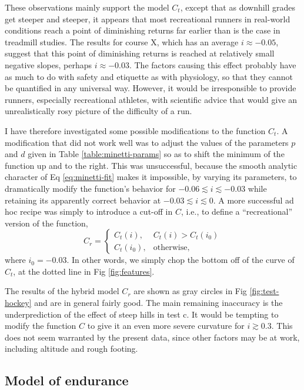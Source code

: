 \documentclass[10pt,letterpaper]{article}
\begin{document}
These observations mainly support the model $C_t$, except that as
downhill grades get steeper and steeper, it appears that most
recreational runners in real-world conditions reach a point of
diminishing returns far earlier than is the case in treadmill studies.
The results for course X, which has an average $i\approx -0.05$,
suggest that this point of diminishing returns is reached at relatively
small negative slopes, perhaps $i\approx -0.03$.
The factors causing this effect probably have as much to do with safety and etiquette as
with physiology, so that they cannot be quantified in any
universal way. However, it would be irresponsible to provide runners,
especially recreational athletes, with scientific advice that would
give an unrealistically rosy picture of the difficulty of a run.

I have therefore investigated some possible modifications to the function
$C_t$. A modification that did not work well was to adjust the values of the parameters $p$ and $d$
given in Table \ref{table:minetti-params} so as to shift the minimum of
the function up and to the right. This was unsuccessful, because the smooth
analytic character of Eq \eqref{eq:minetti-fit} makes it impossible, by varying its parameters, to 
dramatically modify the function's behavior for $-0.06\lesssim i \lesssim -0.03$
while retaining its apparently correct behavior at $-0.03 \lesssim i \lesssim 0$.
A more successful ad hoc recipe was simply to introduce a cut-off in $C$, i.e.,
to define a ``recreational'' version of the function,
\begin{equation}\label{eq:rec}
  C_r =   \begin{cases}
     C_t(i), & C_t(i)>C_t(i_0) \\
     C_t(i_0), & \text{otherwise},
  \end{cases}
\end{equation}
where $i_0=-0.03$.
In other words, we simply chop the bottom off of the curve of $C_t$, at the dotted
line in Fig \ref{fig:features}.

The results of the hybrid model $C_r$ are shown as gray circles in Fig \ref{fig:test-hockey}
and are in general fairly good. The main remaining inaccuracy is the underprediction of the
effect of steep hills in test c. It would be tempting to modify the function $C$ to give it
an even more severe curvature for $i\gtrsim 0.3$. This does not seem warranted by the present
data, since other factors may be at work, including altitude and rough footing.

\subsection{Model of endurance}
\end{document}
